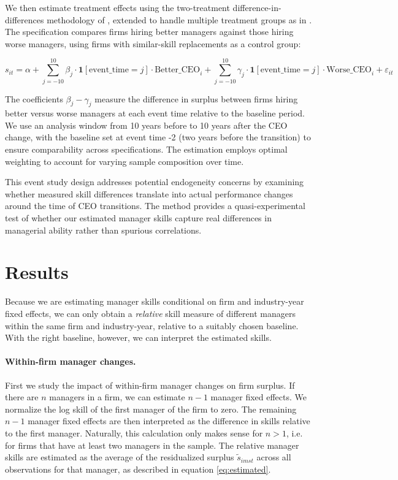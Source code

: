 \documentclass[11pt,a4paper]{article}
\begin{document}
We then estimate treatment effects using the two-treatment difference-in-differences methodology of \citet{Callaway2021JoLE}, extended to handle multiple treatment groups as in \citet{Koren2023expat}. The specification compares firms hiring better managers against those hiring worse managers, using firms with similar-skill replacements as a control group:

\begin{equation}
s_{it} = \alpha + \sum_{j=-10}^{10} \beta_j \cdot \mathbf{1}[\text{event\_time} = j] \cdot \text{Better\_CEO}_i + \sum_{j=-10}^{10} \gamma_j \cdot \mathbf{1}[\text{event\_time} = j] \cdot \text{Worse\_CEO}_i + \varepsilon_{it}
\end{equation}

The coefficients $\beta_j - \gamma_j$ measure the difference in surplus between firms hiring better versus worse managers at each event time relative to the baseline period. We use an analysis window from 10 years before to 10 years after the CEO change, with the baseline set at event time -2 (two years before the transition) to ensure comparability across specifications. The estimation employs optimal weighting to account for varying sample composition over time.

This event study design addresses potential endogeneity concerns by examining whether measured skill differences translate into actual performance changes around the time of CEO transitions. The method provides a quasi-experimental test of whether our estimated manager skills capture real differences in managerial ability rather than spurious correlations.

\section{Results}

Because we are estimating manager skills conditional on firm and industry-year fixed effects, we can only obtain a \emph{relative} skill measure of different managers within the same firm and industry-year, relative to a suitably chosen baseline. With the right baseline, however, we can interpret the estimated skills.

\paragraph{Within-firm manager changes.}
First we study the impact of within-firm manager changes on firm surplus. If there are $n$ managers in a firm, we can estimate $n-1$ manager fixed effects. We normalize the log skill of the first manager of the firm to zero. The remaining $n-1$ manager fixed effects are then interpreted as the difference in skills relative to the first manager. Naturally, this calculation only makes sense for $n>1$, i.e. for firms that have at least two managers in the sample. The relative manager skills are estimated as the average of the residualized surplus $\tilde s_{imst}$ across all observations for that manager, as described in equation \eqref{eq:estimated}. 
\end{document}
